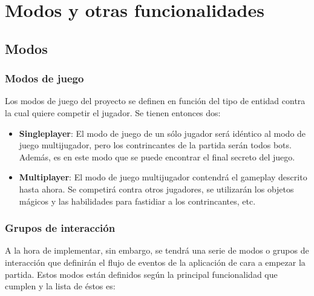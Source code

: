 \section{Modos y otras funcionalidades} %


\subsection{Modos}

\subsubsection{Modos de juego}
Los modos de juego del proyecto se definen en función del tipo de entidad contra la cual quiere competir el jugador. Se tienen entonces dos:

\begin{itemize}
    \item \textbf{Singleplayer}: El modo de juego de un sólo jugador será
    idéntico al modo de juego multijugador, pero los contrincantes de la partida
    serán todos bots. Además, es en este modo que se puede encontrar el final
    secreto del juego.
    \item \textbf{Multiplayer}: El modo de juego multijugador contendrá el
    gameplay descrito hasta ahora. Se competirá contra otros jugadores, se
    utilizarán los objetos mágicos y las habilidades para fastidiar a los
    contrincantes, etc.
\end{itemize}

\subsubsection{Grupos de interacción}

A la hora de implementar, sin embargo, se tendrá una serie de modos o grupos de interacción que definirán el flujo de eventos de la aplicación de cara a empezar la partida. Estos modos están definidos según la principal funcionalidad que cumplen y la lista de éstos es:

